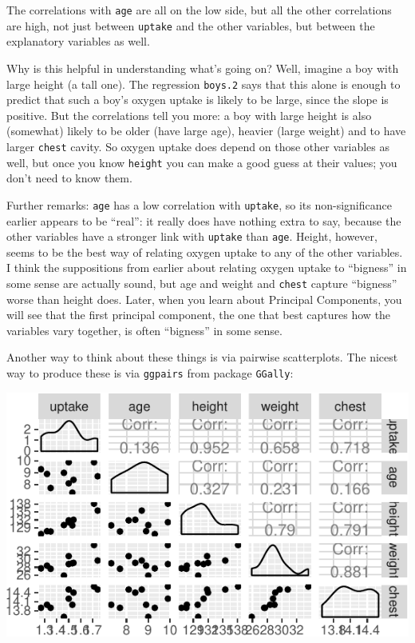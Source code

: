 \documentclass[]{tufte-book}
\newenvironment{Shaded}{}{}
\newcommand{\KeywordTok}[1]{\textcolor[rgb]{0.00,0.44,0.13}{\textbf{#1}}}
\newcommand{\NormalTok}[1]{#1}
\newcommand{\OperatorTok}[1]{\textcolor[rgb]{0.40,0.40,0.40}{#1}}
\newcommand{\StringTok}[1]{\textcolor[rgb]{0.25,0.44,0.63}{#1}}
\theoremstyle{definition}
\theoremstyle{definition}
\theoremstyle{definition}
\theoremstyle{remark}
\begin{document}
The correlations with \texttt{age} are all on the low side, but all the
other correlations are high, not just between \texttt{uptake} and the
other variables, but between the explanatory variables as well.

Why is this helpful in understanding what's going on? Well, imagine a
boy with large height (a tall one). The regression \texttt{boys.2} says
that this alone is enough to predict that such a boy's oxygen uptake is
likely to be large, since the slope is positive. But the correlations
tell you more: a boy with large height is also (somewhat) likely to be
older (have large age), heavier (large weight) and to have larger
\texttt{chest} cavity. So oxygen uptake does depend on those other
variables as well, but once you know \texttt{height} you can make a good
guess at their values; you don't need to know them.

Further remarks: \texttt{age} has a low correlation with
\texttt{uptake}, so its non-significance earlier appears to be ``real'':
it really does have nothing extra to say, because the other variables
have a stronger link with \texttt{uptake} than \texttt{age}. Height,
however, seems to be the best way of relating oxygen uptake to any of
the other variables. I think the suppositions from earlier about
relating oxygen uptake to ``bigness''
in some sense are actually sound, but age and weight and \texttt{chest}
capture ``bigness'' worse than height does. Later, when you learn about
Principal Components, you will see that the first principal component,
the one that best captures how the variables vary together, is often
``bigness'' in some sense.

Another way to think about these things is via pairwise scatterplots.
The nicest way to produce these is via \texttt{ggpairs} from package
\texttt{GGally}:

\begin{Shaded}
\end{Shaded}

\includegraphics{12-regression_files/figure-latex/unnamed-chunk-32-1}
\end{document}

